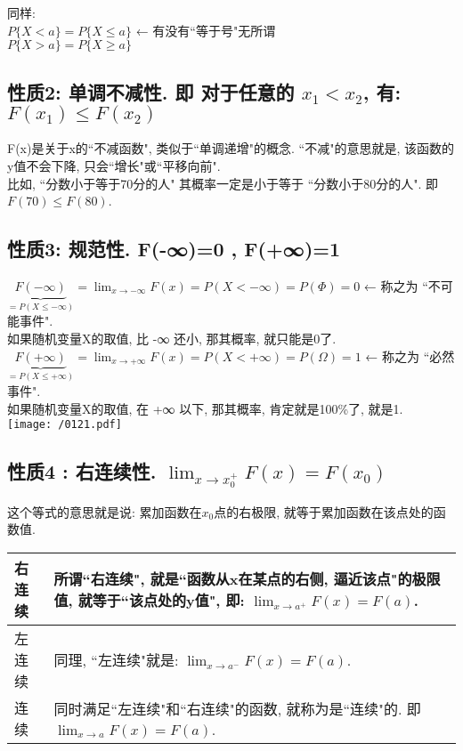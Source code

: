 \documentclass[UTF8]{ctexart}
\begin{document}
同样: \\
$P\{X<a\} = P \{X \leq a \}$  ← 有没有``等于号"无所谓 \\
$P\{X > a\} = P \{X \geq a \} $





\subsection{性质2: 单调不减性. 即 对于任意的 $x_1 < x_2$, 有: $F(x_1) \leq F(x_2)$}

F(x)是关于x的``不减函数", 类似于``单调递增"的概念. ``不减"的意思就是, 该函数的y值不会下降, 只会``增长"或``平移向前". \\

比如, ``分数小于等于70分的人" 其概率一定是小于等于 ``分数小于80分的人". 即 $F(70) \leq F(80)$.



\subsection{性质3: 规范性. F(-∞)=0 , F(+∞)=1}

$ \boxed{
\underset{=P(X\leq -\infty )}{\underbrace{F(-\infty )}}=\lim_{x\rightarrow -\infty}F(x)=P(X < - \infty) = P(\Phi)=0
}$ ← 称之为 ``不可能事件". \\
如果随机变量X的取值, 比 -∞ 还小, 那其概率, 就只能是0了. \\


$\boxed{
\underset{=P(X\leq +\infty )}{\underbrace{F(+\infty )}}=\lim_{x\rightarrow +\infty}F(x)=P(X < + \infty) = P(\Omega)=1
}$ ← 称之为 ``必然事件". \\
如果随机变量X的取值, 在 +∞ 以下, 那其概率, 肯定就是100\%了, 就是1. \\

\texttt{[image: /0121.pdf]} \\







\subsection{性质4 : 右连续性. $\lim_{x \to x_0^+} F(x)=F(x_0)$ }

这个等式的意思就是说: 累加函数在$x_0$点的右极限, 就等于累加函数在该点处的函数值. \\

\begin{tabular}{|p{}|p{}|}
	\hline
	右连续 &  所谓``右连续", 就是``函数从x在某点的右侧, 逼近该点"的极限值, 就等于``该点处的y值", 即: $\lim_{x \to a^+} F(x) = F(a)$.\\
	\hline
	左连续 &  同理, ``左连续"就是: $\lim_{x \to a^-} F(x) = F(a)$.\\
	\hline
	连续 & 同时满足``左连续"和``右连续"的函数, 就称为是``连续"的. 即 $\lim_{x \to a} F(x) = F(a)$. \\
	\hline
\end{tabular} \\
\end{document}
